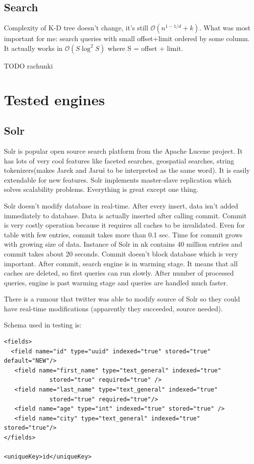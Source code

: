 \documentclass[10pt,a4paper]{article}
\newcommand{\Oh}{\mathcal{O}}
\begin{document}
\subsection{Search}
Complexity of K-D tree doesn't change, it's still $\Oh(n^{1-1/d} + k)$. What was most important for me: search queries with small offset+limit ordered by some column. It actually works in $\Oh(S \log^2 S)$ where S = offset + limit. 

TODO rachunki


\section{Tested engines}
\subsection{Solr}

Solr is popular open source search platform from the Apache Lucene project. It has lots of very cool features like faceted searches, geospatial searches, string tokenizers(makes Jarek and Jaruś to be interpreted as the same word). It is easily extendable for new features. Solr implements master-slave replication which solves scalability problems. Everything is great except one thing. 

Solr doesn't modify database in real-time. After every insert, data isn't added immediately to database. Data is actually inserted after calling commit. Commit is very costly operation because it requires all caches to be invalidated.
Even for table with few entries, commit takes more than 0.1 sec. Time for commit grows with growing size of data. Instance of Solr in nk contains 40 million entries and commit takes about 20 seconds. Commit doesn't block database which is very important.
After commit, search engine is in warming stage. It means that all caches are deleted, so first queries can run slowly. After number of processed queries, engine is past warming stage and queries are handled much faster.

There is a rumour that twitter was able to modify source of Solr so they could have real-time modifications (apparently they succeeded, source needed).

Schema used in testing is:

\begin{lstlisting}
<fields>
  <field name="id" type="uuid" indexed="true" stored="true" default="NEW"/>
   <field name="first_name" type="text_general" indexed="true"
             stored="true" required="true" /> 
   <field name="last_name" type="text_general" indexed="true" 
             stored="true" required="true"/>
   <field name="age" type="int" indexed="true" stored="true" /> 
   <field name="city" type="text_general" indexed="true" stored="true"/>
</fields>

<uniqueKey>id</uniqueKey> 
\end{lstlisting}
\end{document}
